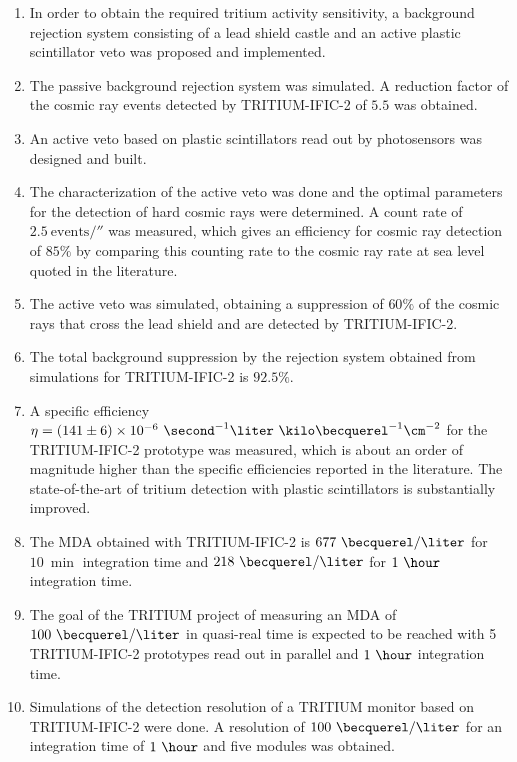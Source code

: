 \begin{enumerate}
\item{} In order to obtain the required tritium activity sensitivity, a background rejection system consisting of a lead shield castle and an active plastic scintillator veto was proposed and implemented.

\item{} The passive background rejection system was simulated. A reduction factor of the cosmic ray events detected by TRITIUM-IFIC-2 of $5.5$ was obtained.

\item{} An active veto based on plastic scintillators read out by photosensors was designed and built.

\item{} The characterization of the active veto was done and the optimal parameters for the detection of hard cosmic rays were determined. A count rate of $2.5~\text{events}/\second$ was measured, which gives an efficiency for cosmic ray detection of $85\%$ by comparing this counting rate to the cosmic ray rate at sea level quoted in the literature.

\item{} The active veto was simulated, obtaining a suppression of $60\%$ of the cosmic rays that cross the lead shield and are detected by TRITIUM-IFIC-2.

\item{} The total background suppression by the rejection system obtained from simulations for TRITIUM-IFIC-2 is $92.5\%$.

\item{} A specific efficiency $\eta = (141 \pm 6) \times 10^{-6}~ \second^{-1}  \liter ~ \kilo\becquerel^{-1} \cm^{-2}$ for the TRITIUM-IFIC-2  prototype was measured, which is about an order of magnitude higher than the specific efficiencies reported in the literature. The state-of-the-art of tritium detection with plastic scintillators is substantially improved.

\item{} The MDA obtained with TRITIUM-IFIC-2 is $677~\becquerel/\liter$  for $10~\min$ integration time and $218~\becquerel/\liter$ for $1~\hour$ integration time.

\item{} The goal of the TRITIUM project of measuring an MDA of $100~\becquerel/\liter$ in quasi-real time is expected to be reached with 5 TRITIUM-IFIC-2 prototypes read out in parallel and $1~\hour$ integration time.

\item{} Simulations of the detection resolution of a TRITIUM monitor based on TRITIUM-IFIC-2 were done. A resolution of $100~\becquerel/\liter$ for an integration time of $1~\hour$ and five modules was obtained.


\end{enumerate}
